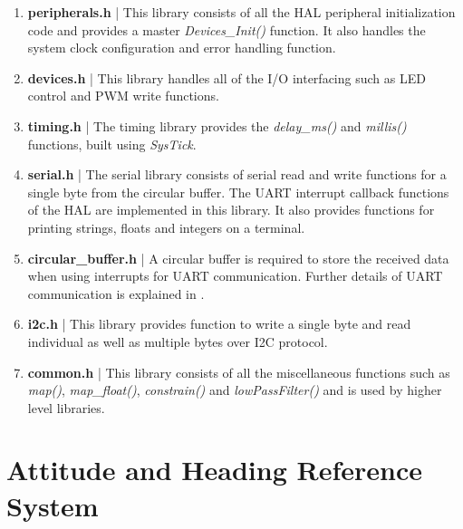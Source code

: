 \documentclass[a4paper,12pt,oneside]{book}
\begin{document}
\begin{enumerate}
\item  \textbf{peripherals.h} | This library consists of all the HAL peripheral initialization code and provides a master \textit{Devices{\_}Init()} function. It also handles the system clock configuration and error handling function.\\

\item \textbf{devices.h} | This library handles all of the I/O interfacing such as LED control and PWM write functions.\\

\item \textbf{timing.h} | The timing library provides the \textit{delay{\_}ms()} and \textit{millis()} functions, built using \textit{SysTick}.\\

\item \textbf{serial.h} | The serial library consists of serial read and write functions for a single byte from the circular buffer. The UART interrupt callback functions of the HAL are implemented in this library. It also provides functions for printing strings, floats and integers on a terminal.\\

\item \textbf{circular{\_}buffer.h} | A circular buffer is required to store the received data when using interrupts for UART communication. Further details of UART communication is explained in \cite{fifo}.\\

\item \textbf{i2c.h} | This library provides function to write a single byte and read individual as well as multiple bytes over I2C protocol.\\

\item \textbf{common.h} | This library consists of all the miscellaneous functions such as \textit{map()}, \textit{map{\_}float()}, \textit{constrain()} and \textit{lowPassFilter()} and is used by higher level libraries.\\

\end{enumerate}

\section{Attitude and Heading Reference System}
\end{document}
